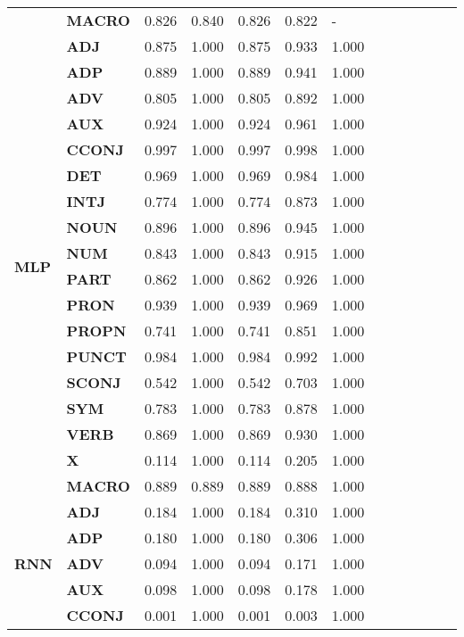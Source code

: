 \begin{longtable}{|l||l||l||l||l||l||l||l||l||l||l||l||l|}
\textbf{} & \textbf{MACRO} & 0.826 & 0.840 & 0.826 & 0.822 & - \\
\cline{1-7}
\multirow[t]{18}{*}{\textbf{MLP}} & \textbf{ADJ} & 0.875 & 1.000 & 0.875 & 0.933 & 1.000 \\
\textbf{} & \textbf{ADP} & 0.889 & 1.000 & 0.889 & 0.941 & 1.000 \\
\textbf{} & \textbf{ADV} & 0.805 & 1.000 & 0.805 & 0.892 & 1.000 \\
\textbf{} & \textbf{AUX} & 0.924 & 1.000 & 0.924 & 0.961 & 1.000 \\
\textbf{} & \textbf{CCONJ} & 0.997 & 1.000 & 0.997 & 0.998 & 1.000 \\
\textbf{} & \textbf{DET} & 0.969 & 1.000 & 0.969 & 0.984 & 1.000 \\
\textbf{} & \textbf{INTJ} & 0.774 & 1.000 & 0.774 & 0.873 & 1.000 \\
\textbf{} & \textbf{NOUN} & 0.896 & 1.000 & 0.896 & 0.945 & 1.000 \\
\textbf{} & \textbf{NUM} & 0.843 & 1.000 & 0.843 & 0.915 & 1.000 \\
\textbf{} & \textbf{PART} & 0.862 & 1.000 & 0.862 & 0.926 & 1.000 \\
\textbf{} & \textbf{PRON} & 0.939 & 1.000 & 0.939 & 0.969 & 1.000 \\
\textbf{} & \textbf{PROPN} & 0.741 & 1.000 & 0.741 & 0.851 & 1.000 \\
\textbf{} & \textbf{PUNCT} & 0.984 & 1.000 & 0.984 & 0.992 & 1.000 \\
\textbf{} & \textbf{SCONJ} & 0.542 & 1.000 & 0.542 & 0.703 & 1.000 \\
\textbf{} & \textbf{SYM} & 0.783 & 1.000 & 0.783 & 0.878 & 1.000 \\
\textbf{} & \textbf{VERB} & 0.869 & 1.000 & 0.869 & 0.930 & 1.000 \\
\textbf{} & \textbf{X} & 0.114 & 1.000 & 0.114 & 0.205 & 1.000 \\
\textbf{} & \textbf{MACRO} & 0.889 & 0.889 & 0.889 & 0.888 & 1.000 \\
\cline{1-7}
\multirow[t]{18}{*}{\textbf{RNN}} & \textbf{ADJ} & 0.184 & 1.000 & 0.184 & 0.310 & 1.000 \\
\textbf{} & \textbf{ADP} & 0.180 & 1.000 & 0.180 & 0.306 & 1.000 \\
\textbf{} & \textbf{ADV} & 0.094 & 1.000 & 0.094 & 0.171 & 1.000 \\
\textbf{} & \textbf{AUX} & 0.098 & 1.000 & 0.098 & 0.178 & 1.000 \\
\textbf{} & \textbf{CCONJ} & 0.001 & 1.000 & 0.001 & 0.003 & 1.000 \\

\end{longtable}
